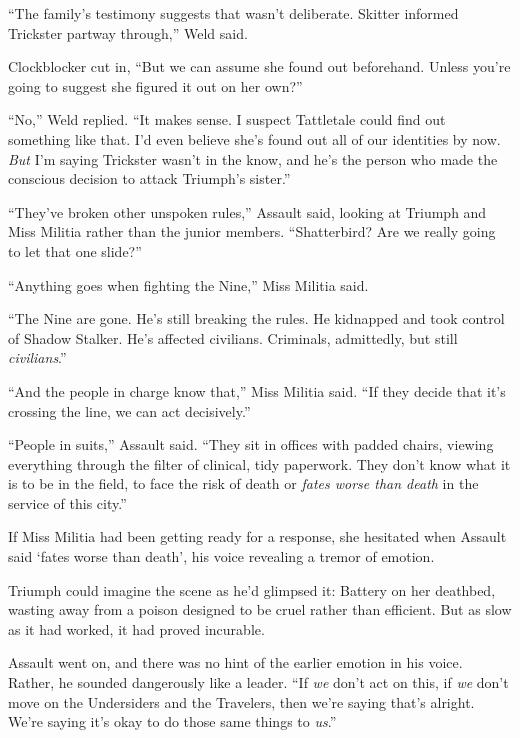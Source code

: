 ``The family's testimony suggests that wasn't deliberate.  Skitter informed Trickster partway through,'' Weld said.



Clockblocker cut in, ``But we can assume she found out beforehand.  Unless you're going to suggest she figured it out on her own?''



``No,'' Weld replied.  ``It makes sense.  I suspect Tattletale could find out something like that.  I'd even believe she's found out all of our identities by now.  \emph{But} I'm saying Trickster wasn't in the know, and he's the person who made the conscious decision to attack Triumph's sister.''



``They've broken other unspoken rules,'' Assault said, looking at Triumph and Miss Militia rather than the junior members.  ``Shatterbird?  Are we really going to let that one slide?''



``Anything goes when fighting the Nine,'' Miss Militia said.



``The Nine are gone.  He's still breaking the rules.  He kidnapped and took control of Shadow Stalker.  He's affected civilians.  Criminals, admittedly, but still \emph{civilians}.''



``And the people in charge know that,'' Miss Militia said.  ``If they decide that it's crossing the line, we can act decisively.''



``People in suits,'' Assault said.  ``They sit in offices with padded chairs, viewing everything through the filter of clinical, tidy paperwork.  They don't know what it is to be in the field, to face the risk of death or \emph{fates worse than death} in the service of this city.''



If Miss Militia had been getting ready for a response, she hesitated when Assault said `fates worse than death', his voice revealing a tremor of emotion.



Triumph could imagine the scene as he'd glimpsed it: Battery on her deathbed, wasting away from a poison designed to be cruel rather than efficient.  But as slow as it had worked, it had proved incurable.



Assault went on, and there was no hint of the earlier emotion in his voice.  Rather, he sounded dangerously like a leader.  ``If \emph{we} don't act on this, if \emph{we} don't move on the Undersiders and the Travelers, then we're saying that's alright.  We're saying it's okay to do those same things to \emph{us}.''



